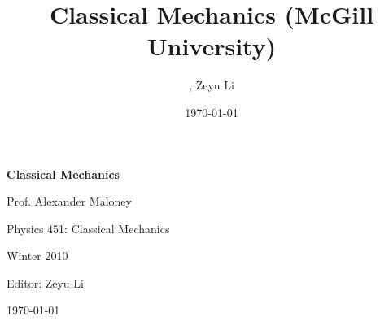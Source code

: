 \documentclass{article}
\title{Classical Mechanics (McGill University)}
\author{, Zeyu Li}
\date{\today}
\theoremstyle{definition}
\theoremstyle{plain}
\theoremstyle{remark}
\begin{document}
\begin{titlepage}
    \centering
    \vspace*{5cm}
    {\Huge\bfseries Classical Mechanics \par}
    \vspace{1.5cm}
    {\Large Prof. Alexander Maloney\par}
    \vspace{1.5cm}
    {\Large Physics 451: Classical Mechanics \par}
    {\Large Winter 2010 \par}
    \vspace{1.5cm}
    {\Large Editor: Zeyu Li \par}
    \vspace{1.5cm}
    {\Large \today\par}
    \vfill
\end{titlepage}
    
\tableofcontents
\newpage
    



    
\end{document}
